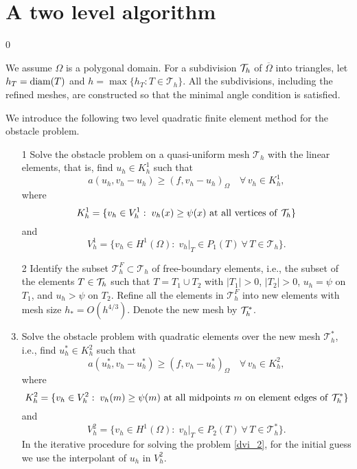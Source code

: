 \documentclass[12pt]{article}
\begin{document}
\section{A two level algorithm}\label{sec:alg}
\setcounter{equation}0

We assume $\Omega$ is a polygonal domain.  For a subdivision ${\cal T}_h$ of
$\overline{\Omega}$ into triangles, let $h_T ={\rm diam}(T)$ and $h =
\max\{h_T: T\in \mathcal{T}_h\}$.  All the subdivisions, including the refined meshes,
are constructed so that the minimal angle condition is satisfied.


We introduce the following two level quadratic finite element method for the obstacle problem.
\begin{enumerate}
\item[1] Solve the obstacle problem on a quasi-uniform mesh $\mathcal{T}_h$ with the linear elements, 
that is, find $u_h \in K_h^1$ such that
\begin{equation}\label{dvi_1}
a(u_h,v_h-u_h) \geq (f,v_h-u_h)_\Omega \quad\forall\,v_h \in K_h^1,
\end{equation}
where
\[ K_h^1 = \{ v_h \in V_h^1: \; v_h(x) \geq \psi(x)\ {\rm at\ all\ vertices\ of}\ \mathcal{T}_h\} \]
and 
\[ V_h^1 =\{v_h \in H^1(\Omega): \;v_h |_T \in P_1(T)\
\forall\,T\in\mathcal{T}_h   \}. \]
\item[2] Identify the subset $\mathcal{T}_h^F\subset\mathcal{T}_h$ of free-boundary elements, 
i.e., the subset of the elements $T\in{\cal T}_h$ such that $T=T_1\cup T_2$ with $|T_1|>0$, 
$|T_2|>0$, $u_h=\psi$ on $T_1$, and $u_h>\psi$ on $T_2$.  
Refine all the elements in $\mathcal{T}_h^F$ into new elements 
with mesh size $h_*=O(h^{4/3})$.  Denote the new mesh by ${\cal T}_h^*$.
\item Solve the obstacle problem with quadratic elements over the new mesh $\mathcal{T}_h^*$, 
i.e., find $u_h^* \in K_h^2$ such that
\begin{equation}\label{dvi_2}
a(u_h^*,v_h-u^*_h) \geq (f,v_h-u^*_h)_\Omega \quad\forall\,v_h \in K_h^2,
\end{equation}
where
\[ K_h^2 = \{ v_h \in V_h^2: \; v_h(m) \geq \psi(m)\ {\rm at\ all\
midpoints}\ m\ {\rm on\ element \ edges\ of}\ \mathcal{T}_h^*\} \]
and
\[ V_h^2=\{v_h \in H^1(\Omega): \;v_h |_T \in P_2(T)\ \forall\,T\in\mathcal{T}_h^*  \}. \]
In the iterative procedure for solving the problem \eqref{dvi_2}, for the initial guess 
we use the interpolant of $u_h$ in $V_h^2$.
\end{enumerate}
\end{document}
